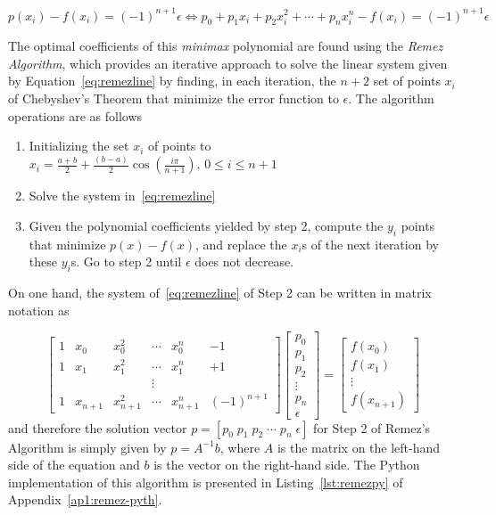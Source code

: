 \begin{equation}\label{eq:remezline}
    p(x_i) - f(x_i) = (-1)^{n+1} \epsilon \Leftrightarrow p_0 + p_1 x_i + p_2 x_i^2 + \cdots + p_n x_i^n - f(x_i) = (-1)^{n+1} \epsilon
\end{equation}

The optimal coefficients of this \textit{minimax} polynomial are found using the \textit{Remez Algorithm}, which provides an iterative approach to solve the linear system given by Equation~\ref{eq:remezline} by finding, in each iteration, the $n+2$ set of points $x_i$ of Chebyshev's Theorem that minimize the error function to $\epsilon$. The algorithm operations are as follows

\begin{enumerate}
    \item Initializing the set $x_i$ of points to $x_i = \frac{a+b}{2} + \frac{(b-a)}{2}\cos\left(\frac{i\pi}{n+1}\right), \, 0 \leq i \leq n+1$
    \item Solve the system in~\ref{eq:remezline}
    \item Given the polynomial coefficients yielded by step 2, compute the $y_i$ points that minimize $p(x)-f(x)$, and replace the $x_i$s of the next iteration by these $y_i$s. Go to step 2 until $\epsilon$ does not decrease.
\end{enumerate}

On one hand, the system of~\ref{eq:remezline} of Step 2 can be written in matrix notation as

\begin{equation}
\begin{bmatrix} 1 & x_0 & x_0^2 & \cdots & x_0^n & - 1 \\ 1 & x_1 & x_1^2 & \cdots & x_1^n & + 1 \\  &  &  & \vdots & & \\ 1 & x_{n+1} & x_{n+1}^2 & \cdots & x_{n+1}^n & (-1)^{n+1} \end{bmatrix}
\begin{bmatrix} p_0 \\ p_1 \\ p_2 \\ \vdots \\ p_n \\ \epsilon \end{bmatrix} = \begin{bmatrix} f(x_0) \\ f(x_1) \\ \vdots \\ f(x_{n+1}) \end{bmatrix}
\end{equation}
and therefore the solution vector $p = \left[p_0 \; p_1 \; p_2 \; \cdots \; p_n \; \epsilon \right]$ for Step 2 of Remez's Algorithm is simply given by $p = A^{-1}b$, where $A$ is the matrix on the left-hand side of the equation and $b$ is the vector on the right-hand side. The Python implementation of this algorithm is presented in Listing~\ref{lst:remezpy} of Appendix~\ref{ap1:remez-pyth}.

